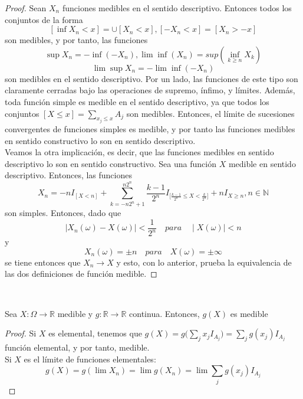\begin{proof}
Sean $X_n$ funciones medibles en el sentido descriptivo. Entonces todos los conjuntos de la forma
$$[\inf X_n < x] = \cup [X_n < x], [-X_n < x] = [X_n > -x]$$
son medibles, y por tanto, las funciones
$$\sup X_n = - \inf (-X_n), \lim \inf (X_n) = sup (\inf_{k \geq n} X_k)$$
$$ \lim \sup X_n = - \lim \inf (-X_n)$$
son medibles en el sentido descriptivo. Por un lado, las funciones de este tipo son claramente cerradas bajo las operaciones de supremo, ínfimo, y límites. Además, toda función simple es medible en el sentido descriptivo, ya que todos los conjuntos $[X \leq x] = \displaystyle \sum_{x_j \leq x} A_j$ son medibles. Entonces, el límite de sucesiones convergentes de funciones simples es medible, y por tanto las funciones medibles en sentido constructivo lo son en sentido descriptivo.\\

Veamos la otra implicación, es decir, que las funciones medibles en sentido descriptivo lo son en sentido constructivo. Sea una función $X$ medible en sentido descriptivo. Entonces, las funciones
$$X_n = -nI_{[X < n]} + \sum_{k=-n2^n+1}^{n2^n}\frac{k-1}{2^n}I_{\big[\frac{k-1}{2^n} \leq X < \frac{k}{2^n} \big]} + nI_{X \geq n}, n \in \mathbb{N}$$
son simples. Entonces, dado que
$$\mid X_n(\omega) - X(\omega)\mid < \frac{1}{2^n} \quad para \quad \mid X(\omega)\mid < n$$
y
$$X_n(\omega) = \pm n \quad para \quad  X(\omega) = \pm \infty$$
se tiene entonces que $X_n \to X$ y esto, con lo anterior, prueba la equivalencia de las dos definiciones de función medible.


\end{proof}


\begin{theorem}
  \ 
  
Sea $X:\Omega \longrightarrow \mathbb{R}$ medible y $g: \mathbb{R} \longrightarrow \mathbb{R}$ continua. Entonces, $ g(X)$ es medible
\end{theorem}

\begin{proof}
Si $X$ es elemental, tenemos que $\displaystyle g(X) = g\Big(\sum_jx_jI_{A_j}\Big)= \sum_j g(x_j)I_{A_j}$ función elemental, y por tanto, medible.\\

Si $X$ es el límite de funciones elementales:
$$g(X) = g(\lim X_n) = \lim g(X_n) = \lim \sum_j g(x_j)I_{A_j}$$


\end{proof}

